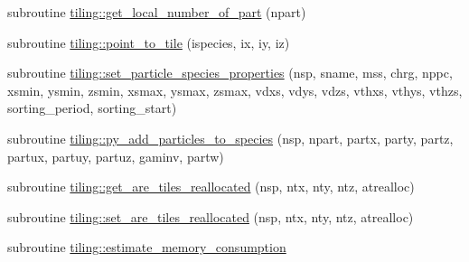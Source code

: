 \begin{DoxyCompactItemize}
subroutine \hyperlink{namespacetiling_af9f6fdf5c755688f10dc74ed3c363d85}{tiling\+::get\+\_\+local\+\_\+number\+\_\+of\+\_\+part} (npart)
\item 
subroutine \hyperlink{namespacetiling_a875e1671637fb100355fe099ef2a4f63}{tiling\+::point\+\_\+to\+\_\+tile} (ispecies, ix, iy, iz)
\item 
subroutine \hyperlink{namespacetiling_a832a380c64af7fb0611b3528b1b28ef2}{tiling\+::set\+\_\+particle\+\_\+species\+\_\+properties} (nsp, sname, mss, chrg, nppc, xsmin, ysmin, zsmin, xsmax, ysmax, zsmax, vdxs, vdys, vdzs, vthxs, vthys, vthzs, sorting\+\_\+period, sorting\+\_\+start)
\item 
subroutine \hyperlink{namespacetiling_a7d2954e264909ff996bff6096932a53d}{tiling\+::py\+\_\+add\+\_\+particles\+\_\+to\+\_\+species} (nsp, npart, partx, party, partz,                                                       partux, partuy, partuz, gaminv, partw)
\item 
subroutine \hyperlink{namespacetiling_a74f93e807809bce73965e51431a8f8c7}{tiling\+::get\+\_\+are\+\_\+tiles\+\_\+reallocated} (nsp, ntx, nty, ntz, atrealloc)
\item 
subroutine \hyperlink{namespacetiling_a9ac073551919a3ca368f58e56b9370e6}{tiling\+::set\+\_\+are\+\_\+tiles\+\_\+reallocated} (nsp, ntx, nty, ntz, atrealloc)
\item 
subroutine \hyperlink{namespacetiling_a535146a13d8c0743eba14d150ca49199}{tiling\+::estimate\+\_\+memory\+\_\+consumption}
\end{DoxyCompactItemize}
